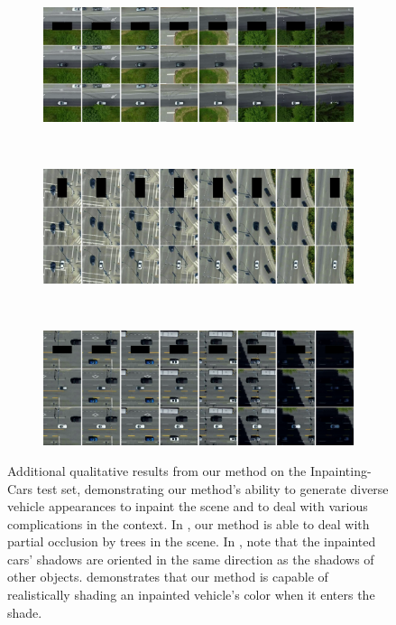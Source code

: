\begin{figure}[t!]
    \centering
    \begin{subfigure}[t]{\textwidth}
        \centering
        \includegraphics[width=\textwidth]{figures/additional-samples/cars_3028.pdf}
        \label{fig:extra-cars1}
    \end{subfigure}
    ~
    \begin{subfigure}[t]{\textwidth}
        \centering
        \includegraphics[width=\textwidth]{figures/additional-samples/cars_3067.pdf}
        \label{fig:extra-cars2}
    \end{subfigure}
    ~
    \begin{subfigure}[t]{\textwidth}
        \centering
        \includegraphics[width=\textwidth]{figures/additional-samples/cars_3093.pdf}
        \label{fig:extra-cars3}
    \end{subfigure}%
    \caption[Additional qualitative results from our method on the Inpainting-Cars
    test set.]{Additional qualitative results from our method on the Inpainting-Cars test set, demonstrating our method's ability to generate diverse vehicle appearances to inpaint the scene and to deal with various complications in the context.  In , our method is able to deal with partial occlusion by trees in the scene. In , note that the inpainted cars' shadows are oriented in the same direction as the shadows of other objects.  demonstrates that our method is capable of realistically shading an inpainted vehicle's color when it enters the shade.
    }
    \label{fig:extra-cars}
\end{figure}
